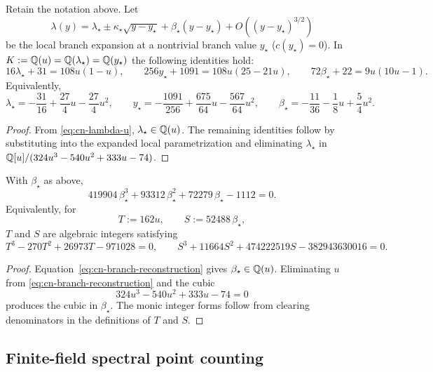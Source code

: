 \begin{corollary}\label{cor:cn-branch-quadratic-reconstruction}
Retain the notation above. Let
\[
\lambda(y)=\lambda_\star\pm\kappa_\star\sqrt{y-y_\star}+\beta_\star(y-y_\star)+O\!\left((y-y_\star)^{3/2}\right)
\]
be the local branch expansion at a nontrivial branch value \(y_\star\) (\(c(y_\star)=0\)).
In \(K:=\mathbb{Q}(u)=\mathbb{Q}(\lambda_\star)=\mathbb{Q}(y_\star)\) the following identities hold:
\begin{equation}\label{eq:cn-branch-reconstruction}
16\lambda_\star+31=108u(1-u),\qquad
256y_\star+1091=108u(25-21u),\qquad
72\beta_\star+22=9u(10u-1).
\end{equation}
Equivalently,
\[
\lambda_\star=-\frac{31}{16}+\frac{27}{4}u-\frac{27}{4}u^2,\qquad
y_\star=-\frac{1091}{256}+\frac{675}{64}u-\frac{567}{64}u^2,\qquad
\beta_\star=-\frac{11}{36}-\frac{1}{8}u+\frac{5}{4}u^2.
\]
\end{corollary}

\begin{proof}
From \eqref{eq:cn-lambda-u}, \(\lambda_\star\in\mathbb{Q}(u)\). The remaining identities follow by substituting into the expanded local parametrization and eliminating \(\lambda_\star\) in \(\mathbb{Q}[u]/(324u^3-540u^2+333u-74)\).
\end{proof}

\begin{corollary}\label{cor:cn-branch-integrality}
With \(\beta_\star\) as above,
\[
419904\,\beta_\star^3+93312\,\beta_\star^2+72279\,\beta_\star-1112=0.
\]
Equivalently, for
\[
T:=162u,\qquad S:=52488\,\beta_\star,
\]
\(T\) and \(S\) are algebraic integers satisfying
\[
T^3-270T^2+26973T-971028=0,\qquad
S^3+11664S^2+474222519S-382943630016=0.
\]
\end{corollary}

\begin{proof}
Equation~\eqref{eq:cn-branch-reconstruction} gives \(\beta_\star\in\mathbb{Q}(u)\). Eliminating \(u\) from \eqref{eq:cn-branch-reconstruction} and the cubic
\[
324u^3-540u^2+333u-74=0
\]
produces the cubic in \(\beta_\star\). The monic integer forms follow from clearing denominators in the definitions of \(T\) and \(S\).
\end{proof}

\subsection{Finite-field spectral point counting}
\label{sec:cn-finite-field}

